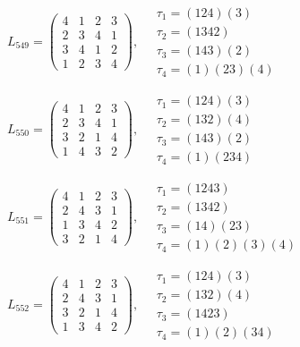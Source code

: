 $L_{549} = \begin{pmatrix} 4 & 1 & 2 & 3 \\ 2 & 3 & 4 & 1 \\ 3 & 4 & 1 & 2 \\ 1 & 2 & 3 & 4 \end{pmatrix}, \quad \begin{matrix} \tau_{1} = (1 2 4)(3) \\ \tau_{2} = (1 3 4 2) \\ \tau_{3} = (1 4 3)(2) \\ \tau_{4} = (1)(2 3)(4) \end{matrix}$

$L_{550} = \begin{pmatrix} 4 & 1 & 2 & 3 \\ 2 & 3 & 4 & 1 \\ 3 & 2 & 1 & 4 \\ 1 & 4 & 3 & 2 \end{pmatrix}, \quad \begin{matrix} \tau_{1} = (1 2 4)(3) \\ \tau_{2} = (1 3 2)(4) \\ \tau_{3} = (1 4 3)(2) \\ \tau_{4} = (1)(2 3 4) \end{matrix}$

$L_{551} = \begin{pmatrix} 4 & 1 & 2 & 3 \\ 2 & 4 & 3 & 1 \\ 1 & 3 & 4 & 2 \\ 3 & 2 & 1 & 4 \end{pmatrix}, \quad \begin{matrix} \tau_{1} = (1 2 4 3) \\ \tau_{2} = (1 3 4 2) \\ \tau_{3} = (1 4)(2 3) \\ \tau_{4} = (1)(2)(3)(4) \end{matrix}$

$L_{552} = \begin{pmatrix} 4 & 1 & 2 & 3 \\ 2 & 4 & 3 & 1 \\ 3 & 2 & 1 & 4 \\ 1 & 3 & 4 & 2 \end{pmatrix}, \quad \begin{matrix} \tau_{1} = (1 2 4)(3) \\ \tau_{2} = (1 3 2)(4) \\ \tau_{3} = (1 4 2 3) \\ \tau_{4} = (1)(2)(3 4) \end{matrix}$

